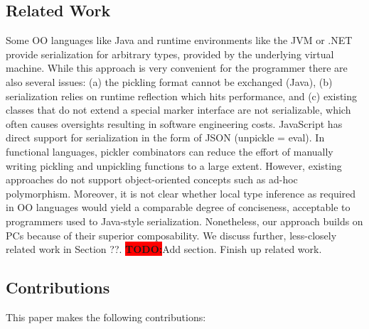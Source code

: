 \documentclass[preprint,10pt]{sigplanconf}
\theoremstyle{definition}
\newcommand{\todo}{{\bf \colorbox{red}{\color{white}TODO:}}}
\begin{document}
\subsection{Related Work}

Some OO languages like Java and runtime environments like the JVM or .NET
provide serialization for arbitrary types, provided by the underlying virtual
machine. While this approach is very convenient for the programmer there are
also several issues: (a) the pickling format cannot be exchanged (Java), (b)
serialization relies on runtime reflection which hits performance, and (c)
existing classes that do not extend a special marker interface are not
serializable, which often causes oversights resulting in software engineering
costs. JavaScript has direct support for serialization in the form of JSON
(unpickle = eval). In functional languages, pickler combinators can reduce the
effort of manually writing pickling and unpickling functions to a large
extent. However, existing approaches do not support object-oriented concepts
such as ad-hoc polymorphism. Moreover, it is not clear whether local type
inference as required in OO languages would yield a comparable degree of
conciseness, acceptable to programmers used to Java-style serialization.
Nonetheless, our approach builds on PCs because of their superior
composability. We discuss further, less-closely related work in Section ??.
\todo Add section. Finish up related work.

\subsection{Contributions}

This paper makes the following contributions:
\end{document}
